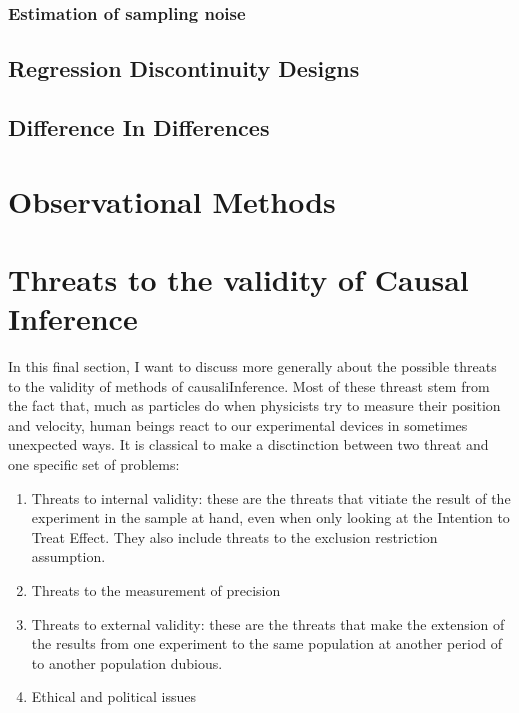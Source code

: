 \documentclass[
]{book}
\providecommand{\tightlist}{%
  \setlength{\itemsep}{0pt}\setlength{\parskip}{0pt}}
\theoremstyle{definition}
\theoremstyle{definition}
\theoremstyle{definition}
\theoremstyle{definition}
\theoremstyle{remark}
\begin{document}
\hypertarget{estimation-of-sampling-noise}{%
\subsection{Estimation of sampling noise}\label{estimation-of-sampling-noise}}

\hypertarget{regression-discontinuity-designs}{%
\section{Regression Discontinuity Designs}\label{regression-discontinuity-designs}}

\hypertarget{difference-in-differences}{%
\section{Difference In Differences}\label{difference-in-differences}}

\hypertarget{sec:OM}{%
\chapter{Observational Methods}\label{sec:OM}}

\hypertarget{sec:threats}{%
\chapter{Threats to the validity of Causal Inference}\label{sec:threats}}

In this final section, I want to discuss more generally about the possible threats to the validity of methods of causaliInference.
Most of these threast stem from the fact that, much as particles do when physicists try to measure their position and velocity, human beings react to our experimental devices in sometimes unexpected ways.
It is classical to make a disctinction between two threat and one specific set of problems:

\begin{enumerate}
\def\labelenumi{\arabic{enumi}.}
\tightlist
\item
  Threats to internal validity: these are the threats that vitiate the result of the experiment in the sample at hand, even when only looking at the Intention to Treat Effect.
  They also include threats to the exclusion restriction assumption.
\item
  Threats to the measurement of precision
\item
  Threats to external validity: these are the threats that make the extension of the results from one experiment to the same population at another period of to another population dubious.
\item
  Ethical and political issues
\end{enumerate}
\end{document}
